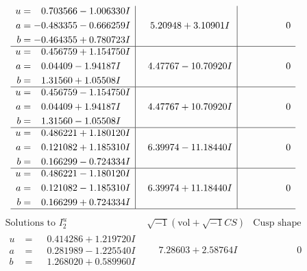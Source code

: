 \documentclass[1p]{elsarticle_modified}
\theoremstyle{definition}
\newcommand{\I}{\sqrt{-1}}
\begin{document}
$$\begin{array}{c|c|c}
\begin{aligned}
u &= \phantom{-}0.703566 - 1.006330 I \\
a &= -0.483355 - 0.666259 I \\
b &= -0.464355 + 0.780723 I\end{aligned}
 & \phantom{-}5.20948 + 3.10901 I & \phantom{-0.000000 } 0 \\ \hline\begin{aligned}
u &= \phantom{-}0.456759 + 1.154750 I \\
a &= \phantom{-}0.04409 - 1.94187 I \\
b &= \phantom{-}1.31560 + 1.05508 I\end{aligned}
 & \phantom{-}4.47767 - 10.70920 I & \phantom{-0.000000 } 0 \\ \hline\begin{aligned}
u &= \phantom{-}0.456759 - 1.154750 I \\
a &= \phantom{-}0.04409 + 1.94187 I \\
b &= \phantom{-}1.31560 - 1.05508 I\end{aligned}
 & \phantom{-}4.47767 + 10.70920 I & \phantom{-0.000000 } 0 \\ \hline\begin{aligned}
u &= \phantom{-}0.486221 + 1.180120 I \\
a &= \phantom{-}0.121082 + 1.185310 I \\
b &= \phantom{-}0.166299 - 0.724334 I\end{aligned}
 & \phantom{-}6.39974 - 11.18440 I & \phantom{-0.000000 } 0 \\ \hline\begin{aligned}
u &= \phantom{-}0.486221 - 1.180120 I \\
a &= \phantom{-}0.121082 - 1.185310 I \\
b &= \phantom{-}0.166299 + 0.724334 I\end{aligned}
 & \phantom{-}6.39974 + 11.18440 I & \phantom{-0.000000 } 0\\
 \hline 
 \end{array}$$\newpage$$\begin{array}{c|c|c}  
\text{Solutions to }I^u_{2}& \I (\text{vol} + \sqrt{-1}CS) & \text{Cusp shape}\\
 \hline 
\begin{aligned}
u &= \phantom{-}0.414286 + 1.219720 I \\
a &= \phantom{-}0.281989 - 1.225540 I \\
b &= \phantom{-}1.268020 + 0.589960 I\end{aligned}
 & \phantom{-}7.28603 + 2.58764 I & \phantom{-0.000000 } 0 \\ \hline\begin{aligned}

\end{aligned}
\end{array}$$
\end{document}
